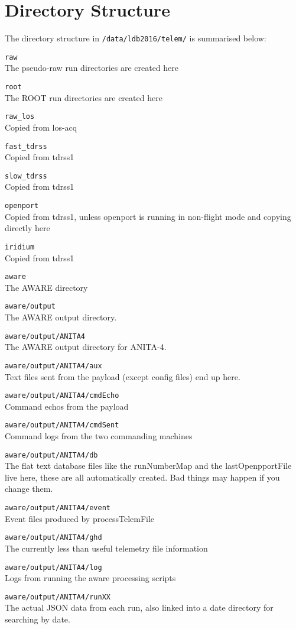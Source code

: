 \documentclass{article}
\begin{document}
\section{Directory Structure}
The directory structure in {\tt /data/ldb2016/telem/} is summarised below:
\begin{description}
\item{{\tt raw}} \\The pseudo-raw run directories are created here
\item{{\tt root}} \\The ROOT run directories are created here
\item{{\tt raw\_los}} \\Copied from los-acq
\item{{\tt fast\_tdrss}} \\Copied from tdrss1
\item{{\tt slow\_tdrss}} \\Copied from tdrss1
\item{{\tt openport}} \\Copied from tdrss1, unless openport is running in non-flight mode and copying directly here
\item{{\tt iridium}} \\Copied from tdrss1
\item{{\tt aware}} \\The AWARE directory
\item{{\tt aware/output}} \\The AWARE output directory.
\item{{\tt aware/output/ANITA4}} \\The AWARE output directory for ANITA-4.
\item{{\tt aware/output/ANITA4/aux}} \\Text files sent from the payload (except config files) end up here.
\item{{\tt aware/output/ANITA4/cmdEcho}}\\ Command echos from the payload
\item{{\tt aware/output/ANITA4/cmdSent}} \\Command logs from the two commanding machines
\item{{\tt aware/output/ANITA4/db}} \\The flat text database files like the runNumberMap and the lastOpenpportFile live here, these are all automatically created. Bad things may happen if you change them.
\item{{\tt aware/output/ANITA4/event}} \\Event files produced by processTelemFile
\item{{\tt aware/output/ANITA4/ghd}} \\The currently less than useful telemetry file information
\item{{\tt aware/output/ANITA4/log}} \\Logs from running the aware processing scripts
\item{{\tt aware/output/ANITA4/runXX}} \\The actual JSON data from each run, also linked into a date directory for searching by date.
\end{description}
\end{document}
